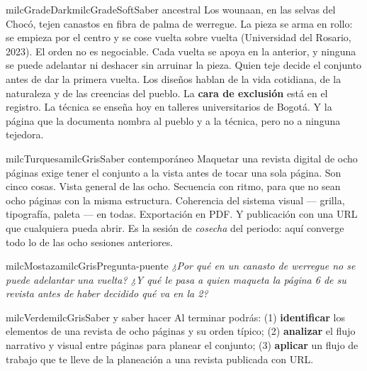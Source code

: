 \documentclass[11pt,letterpaper]{article}
\begin{document}
\begin{softbox}{milcGradeDark}{milcGradeSoft}{Saber ancestral}
Los wounaan, en las selvas del Chocó, tejen canastos en fibra de palma de werregue. La pieza se arma en rollo: se empieza por el centro y se cose vuelta sobre vuelta (Universidad del Rosario, 2023). El orden no es negociable. Cada vuelta se apoya en la anterior, y ninguna se puede adelantar ni deshacer sin arruinar la pieza. Quien teje decide el conjunto antes de dar la primera vuelta. Los diseños hablan de la vida cotidiana, de la naturaleza y de las creencias del pueblo. La \textbf{cara de exclusión} está en el registro. La técnica se enseña hoy en talleres universitarios de Bogotá. Y la página que la documenta nombra al pueblo y a la técnica, pero no a ninguna tejedora.\par{}
\end{softbox}

\begin{softbox}{milcTurquesa}{milcGris}{Saber contemporáneo}
Maquetar una revista digital de ocho páginas exige tener el conjunto a la vista antes de tocar una sola página. Son cinco cosas. Vista general de las ocho. Secuencia con ritmo, para que no sean ocho páginas con la misma estructura. Coherencia del sistema visual --- grilla, tipografía, paleta --- en todas. Exportación en PDF. Y publicación con una URL que cualquiera pueda abrir. Es la sesión de \emph{cosecha} del periodo: aquí converge todo lo de las ocho sesiones anteriores.
\end{softbox}

\begin{softbox}{milcMostaza}{milcGris}{Pregunta-puente}
\textit{¿Por qué en un canasto de werregue no se puede adelantar una vuelta? ¿Y qué le pasa a quien maqueta la página 6 de su revista antes de haber decidido qué va en la 2?}
\end{softbox}

\begin{softbox}{milcVerde}{milcGris}{Saber y saber hacer}
Al terminar podrás: (1) \textbf{identificar} los elementos de una revista de ocho páginas y su orden típico; (2) \textbf{analizar} el flujo narrativo y visual entre páginas para planear el conjunto; (3) \textbf{aplicar} un flujo de trabajo que te lleve de la planeación a una revista publicada con URL.
\end{softbox}
\end{document}
